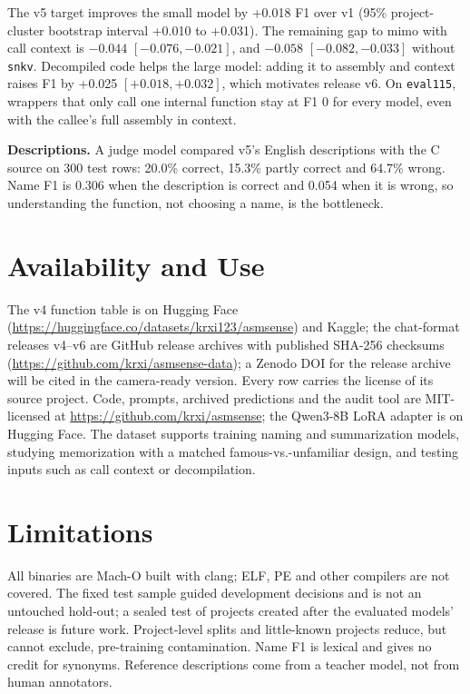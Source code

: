 \documentclass[conference]{IEEEtran}
\begin{document}
The v5 target improves the small model by +0.018 F1 over v1 (95\% project-cluster bootstrap interval +0.010 to +0.031). The remaining gap to mimo with call context is $-0.044$ $[-0.076, -0.021]$, and $-0.058$ $[-0.082, -0.033]$ without \texttt{snkv}. Decompiled code helps the large model: adding it to assembly and context raises F1 by +0.025 $[+0.018, +0.032]$, which motivates release v6. On \texttt{eval115}, wrappers that only call one internal function stay at F1 0 for every model, even with the callee's full assembly in context.

\textbf{Descriptions.} A judge model compared v5's English descriptions with the C source on 300 test rows: 20.0\% correct, 15.3\% partly correct and 64.7\% wrong. Name F1 is 0.306 when the description is correct and 0.054 when it is wrong, so understanding the function, not choosing a name, is the bottleneck.

\section{Availability and Use}
The v4 function table is on Hugging Face (\url{https://huggingface.co/datasets/krxi123/asmsense}) and Kaggle; the chat-format releases v4--v6 are GitHub release archives with published SHA-256 checksums (\url{https://github.com/krxi/asmsense-data}); a Zenodo DOI for the release archive will be cited in the camera-ready version. Every row carries the license of its source project. Code, prompts, archived predictions and the audit tool are MIT-licensed at \url{https://github.com/krxi/asmsense}; the Qwen3-8B LoRA adapter is on Hugging Face. The dataset supports training naming and summarization models, studying memorization with a matched famous-vs.-unfamiliar design, and testing inputs such as call context or decompilation.

\section{Limitations}
All binaries are Mach-O built with clang; ELF, PE and other compilers are not covered. The fixed test sample guided development decisions and is not an untouched hold-out; a sealed test of projects created after the evaluated models' release is future work. Project-level splits and little-known projects reduce, but cannot exclude, pre-training contamination. Name F1 is lexical and gives no credit for synonyms. Reference descriptions come from a teacher model, not from human annotators.
\end{document}
